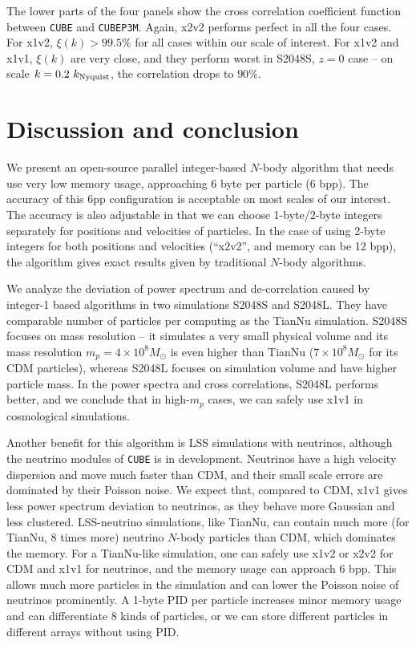 \documentclass[10pt,twocolumn,preprint]{emulateapj}
\newcommand{\Msun}{M_\odot}
\begin{document}
The lower parts of the four panels show the cross correlation coefficient function between {\tt CUBE} and {\tt CUBEP3M}. Again, x2v2 performs perfect in all the four cases. For x1v2, $\xi(k)>99.5\%$ for all cases within our scale of interest. For x1v2 and x1v1, $\xi(k)$ are very close, and they perform worst in S2048S, $z=0$ case -- on scale $k=0.2\ k_{\rm Nyquist}$, the correlation drops to $90\%$.


\section{Discussion and conclusion}\label{s.discussion}
We present an open-source parallel integer-based $N$-body algorithm that needs use very low memory usage, approaching 6 byte per particle (6 bpp). The accuracy of this 6pp configuration is acceptable on most scales of our interest. The accuracy is also adjustable in that we can choose 1-byte/2-byte integers separately for positions and velocities of particles. In the case of using 2-byte integers for both positions and velocities (``x2v2'', and memory can be 12 bpp), the algorithm gives exact results given by traditional $N$-body algorithms.

We analyze the deviation of power spectrum and de-correlation caused by integer-1 based algorithms in two simulations S2048S and S2048L. They have comparable number of particles per computing as the TianNu simulation. S2048S focuses on mass resolution -- it simulates a very small physical volume and its mass resolution $m_p=4\times 10^8\Msun$ is even higher than TianNu ($7\times 10^8\Msun$ for its CDM particles), whereas S2048L focuses on simulation volume and have higher particle mass. In the power spectra and cross correlations, S2048L performs better, and we conclude that in high-$m_p$ cases, we can safely use x1v1 in cosmological simulations.

Another benefit for this algorithm is LSS simulations with neutrinos, although the neutrino modules of {\tt CUBE} is in development. Neutrinos have a high velocity dispersion and move much faster than CDM, and their small scale errors are dominated by their Poisson noise. We expect that, compared to CDM, x1v1 gives less power spectrum deviation to neutrinos, as they behave more Gaussian and less clustered. LSS-neutrino simulations, like TianNu, can contain much more (for TianNu, 8 times more) neutrino $N$-body particles than CDM, which dominates the memory. For a TianNu-like simulation, one can safely use x1v2 or x2v2 for CDM and x1v1 for neutrinos, and the memory usage can approach 6 bpp. This allows much more particles in the simulation and can lower the Poisson noise of neutrinos prominently. A 1-byte PID per particle increases minor memory usage and can differentiate 8 kinds of particles, or we can store different particles in different arrays without using PID.
\end{document}
